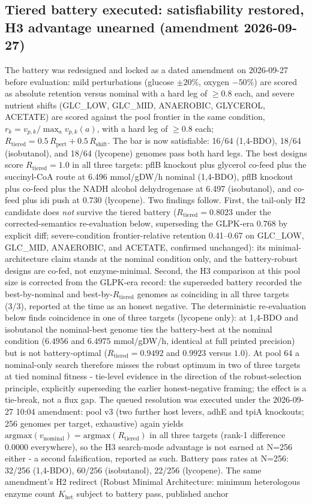 \documentclass[12pt,a4paper]{article}
\begin{document}
\subsection{Tiered battery executed: satisfiability restored, H3 advantage unearned (amendment 2026-09-27)}
The battery was redesigned and locked as a dated amendment on 2026-09-27 before evaluation: mild perturbations (glucose $\pm 20\%$, oxygen $-50\%$) are scored as absolute retention versus nominal with a hard leg of $\ge 0.8$ each, and severe nutrient shifts (GLC\_LOW, GLC\_MID, ANAEROBIC, GLYCEROL, ACETATE) are scored against the pool frontier in the same condition, $r_k = v_{p,k} / \max_a v_{p,k}(a)$, with a hard leg of $\ge 0.8$ each; $R_{\mathrm{tiered}} = 0.5\,R_{\mathrm{pert}} + 0.5\,R_{\mathrm{shift}}$. The bar is now satisfiable: 16/64 (1,4-BDO), 18/64 (isobutanol), and 18/64 (lycopene) genomes pass both hard legs. The best designs score $R_{\mathrm{tiered}} = 1.0$ in all three targets: pflB knockout plus glycerol co-feed plus the succinyl-CoA route at 6.496 mmol/gDW/h nominal (1,4-BDO), pflB knockout plus co-feed plus the NADH alcohol dehydrogenase at 6.497 (isobutanol), and co-feed plus idi push at 0.730 (lycopene). Two findings follow. First, the tail-only H2 candidate does \emph{not} survive the tiered battery ($R_{\mathrm{tiered}} = 0.8023$ under the corrected-semantics re-evaluation below, superseding the GLPK-era $0.768$ by explicit diff; severe-condition frontier-relative retention 0.41--0.67 on GLC\_LOW, GLC\_MID, ANAEROBIC, and ACETATE, confirmed unchanged): its minimal-architecture claim stands at the nominal condition only, and the battery-robust designs are co-fed, not enzyme-minimal. Second, the H3 comparison at this pool size is corrected from the GLPK-era record: the superseded battery recorded the best-by-nominal and best-by-$R_{\mathrm{tiered}}$ genomes as coinciding in all three targets (3/3), reported at the time as an honest negative. The deterministic re-evaluation below finds coincidence in one of three targets (lycopene only): at 1,4-BDO and isobutanol the nominal-best genome ties the battery-best at the nominal condition ($6.4956$ and $6.4975$ mmol/gDW/h, identical at full printed precision) but is not battery-optimal ($R_{\mathrm{tiered}} = 0.9492$ and $0.9923$ versus $1.0$). At pool 64 a nominal-only search therefore misses the robust optimum in two of three targets at tied nominal fitness - tie-level evidence in the direction of the robust-selection principle, explicitly superseding the earlier honest-negative framing; the effect is a tie-break, not a flux gap. The queued resolution was executed under the 2026-09-27 10:04 amendment: pool v3 (two further host levers, adhE and tpiA knockouts; 256 genomes per target, exhaustive) again yields $\mathrm{argmax}(v_{\mathrm{nominal}}) = \mathrm{argmax}(R_{\mathrm{tiered}})$ in all three targets (rank-1 difference 0.0000 everywhere), so the H3 search-mode advantage is not earned at N=256 either - a second falsification, reported as such. Battery pass rates at N=256: 32/256 (1,4-BDO), 60/256 (isobutanol), 22/256 (lycopene). The same amendment's H2 redirect (Robust Minimal Architecture: minimum heterologous enzyme count $K_{\mathrm{het}}$ subject to battery pass, published anchor 
\end{document}
